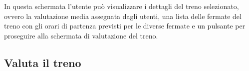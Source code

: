 In questa schermata l'utente può visualizzare i dettagli del treno selezionato, ovvero la valutazione media assegnata dagli utenti, una lista delle fermate del treno con gli orari di partenza previsti per le diverse fermate e un pulsante per proseguire alla schermata di valutazione del treno.

\subsection{Valuta il treno}

\begin{figure}[H]
    \centering
     \quad
     \quad

\end{figure}

